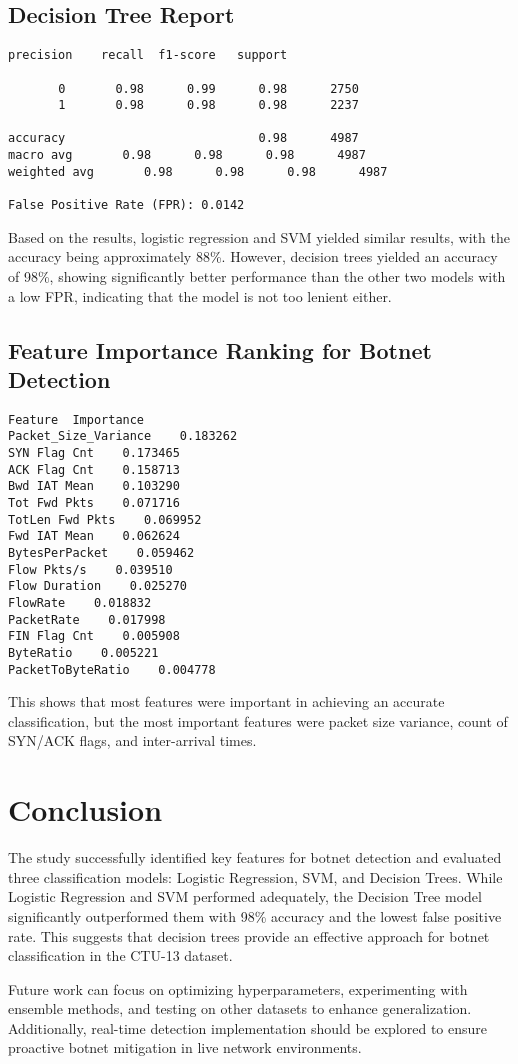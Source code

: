 \documentclass{article}
\begin{document}
\subsection{Decision Tree Report}
\begin{verbatim}
precision    recall  f1-score   support

       0       0.98      0.99      0.98      2750
       1       0.98      0.98      0.98      2237

accuracy                           0.98      4987
macro avg       0.98      0.98      0.98      4987
weighted avg       0.98      0.98      0.98      4987

False Positive Rate (FPR): 0.0142
\end{verbatim}

Based on the results, logistic regression and SVM yielded similar results, with the accuracy being approximately 88\%. However, decision trees yielded an accuracy of 98\%, showing significantly better performance than the other two models with a low FPR, indicating that the model is not too lenient either. 

\subsection{Feature Importance Ranking for Botnet Detection}
\begin{verbatim}
Feature  Importance
Packet_Size_Variance    0.183262
SYN Flag Cnt    0.173465
ACK Flag Cnt    0.158713
Bwd IAT Mean    0.103290
Tot Fwd Pkts    0.071716
TotLen Fwd Pkts    0.069952
Fwd IAT Mean    0.062624
BytesPerPacket    0.059462
Flow Pkts/s    0.039510
Flow Duration    0.025270
FlowRate    0.018832
PacketRate    0.017998
FIN Flag Cnt    0.005908
ByteRatio    0.005221
PacketToByteRatio    0.004778
\end{verbatim}
This shows that most features were important in achieving an accurate classification, but the most important features were packet size variance, count of SYN/ACK flags, and inter-arrival times.

\section{Conclusion}
The study successfully identified key features for botnet detection and evaluated three classification models: Logistic Regression, SVM, and Decision Trees. While Logistic Regression and SVM performed adequately, the Decision Tree model significantly outperformed them with 98\% accuracy and the lowest false positive rate. This suggests that decision trees provide an effective approach for botnet classification in the CTU-13 dataset.

Future work can focus on optimizing hyperparameters, experimenting with ensemble methods, and testing on other datasets to enhance generalization. Additionally, real-time detection implementation should be explored to ensure proactive botnet mitigation in live network environments.
\end{document}
